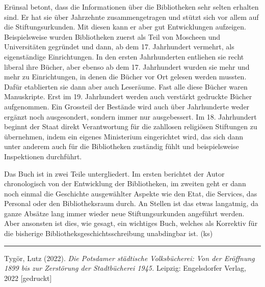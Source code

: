\documentclass[a4paper,
fontsize=11pt,
oneside,
numbers=noperiodatend,
parskip=half-,
bibliography=totoc,
final
]{scrartcl}
\begin{document}
Erünsal betont, dass die Informationen über die Bibliotheken sehr selten
erhalten sind. Er hat sie über Jahrzehnte zusammengetragen und stützt
sich vor allem auf die Stiftungsurkunden. Mit diesen kann er aber gut
Entwicklungen aufzeigen. Beispielsweise wurden Bibliotheken zuerst als
Teil von Moscheen und Universitäten gegründet und dann, ab dem 17.
Jahrhundert vermehrt, als eigenständige Einrichtungen. In den ersten
Jahrhunderten entliehen sie recht liberal ihre Bücher, aber ebenso ab
dem 17. Jahrhundert wurden sie mehr und mehr zu Einrichtungen, in denen
die Bücher vor Ort gelesen werden mussten. Dafür etablierten sie dann
aber auch Leseräume. Fast alle diese Bücher waren Manuskripte. Erst im
19. Jahrhundert werden auch verstärkt gedruckte Bücher aufgenommen. Ein
Grossteil der Bestände wird auch über Jahrhunderte weder ergänzt noch
ausgesondert, sondern immer nur ausgebessert. Im 18. Jahrhundert beginnt
der Staat direkt Verantwortung für die zahllosen religiösen Stiftungen
zu übernehmen, indem ein eigenes Ministerium eingerichtet wird, das sich
dann unter anderem auch für die Bibliotheken zuständig fühlt und
beispielsweise Inspektionen durchführt.

Das Buch ist in zwei Teile untergliedert. Im ersten berichtet der Autor
chronologisch von der Entwicklung der Bibliotheken, im zweiten geht er
dann noch einmal die Geschichte ausgewählter Aspekte wie den Etat, die
Services, das Personal oder den Bibliotheksraum durch. An Stellen ist
das etwas langatmig, da ganze Absätze lang immer wieder neue
Stiftungsurkunden angeführt werden. Aber ansonsten ist dies, wie gesagt,
ein wichtiges Buch, welches als Korrektiv für die bisherige
Bibliotheksgeschichtsschreibung unabdingbar ist. (ks)

\begin{center}\rule{0.5\linewidth}{0.5pt}\end{center}

Tygör, Lutz (2022). \emph{Die Potsdamer städtische Volksbücherei: Von
der Eröffnung 1899 bis zur Zerstörung der Stadtbücherei 1945.} Leipzig:
Engelsdorfer Verlag, 2022 {[}gedruckt{]}
\end{document}
